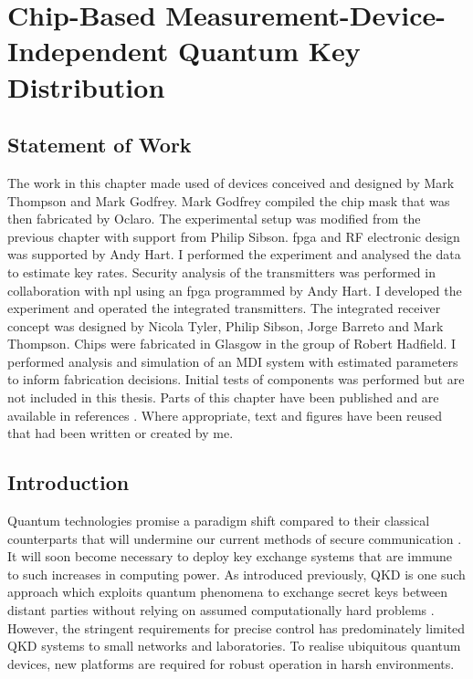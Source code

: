 %
%
\graphicspath{{./chapters/chapter04/fig04/}}

\let\textcircled=\pgftextcircled
\chapter[Chip-Based Measurement-Device-Independent QKD]{Chip-Based Measurement-Device-Independent Quantum Key Distribution}
\label{chap:mdiqkd}

\section*{Statement of Work}

The work in this chapter made used of devices conceived and designed by Mark Thompson and Mark Godfrey. Mark Godfrey compiled the chip mask that was then fabricated by Oclaro. The experimental setup was modified from the previous chapter with support from Philip Sibson. \Ac{fpga} and RF electronic design was supported by Andy Hart. I performed the experiment and analysed the data to estimate key rates. Security analysis of the transmitters was performed in collaboration with \acl{npl} using an \acs{fpga} programmed by Andy Hart. I developed the experiment and operated the integrated transmitters. The integrated receiver concept was designed by Nicola Tyler, Philip Sibson, Jorge Barreto and Mark Thompson. Chips were fabricated in Glasgow in the group of Robert Hadfield. I performed analysis and simulation of an \ac{MDI} system with estimated parameters to inform fabrication decisions. Initial tests of components was performed but are not included in this thesis. Parts of this chapter have been published and are available in references \cite{semenenko2019mdi, semenenko2019integrated, vaquero2018}. Where appropriate, text and figures have been reused that had been written or created by me.

\section{Introduction}

Quantum technologies promise a paradigm shift compared to their classical counterparts that will undermine our current methods of secure communication \cite{shor1994}. It will soon become necessary to deploy key exchange systems that are immune to such increases in computing power. As introduced previously, \ac{QKD} is one such approach which exploits quantum phenomena to exchange secret keys between distant parties without relying on assumed computationally hard problems \cite{BB84, E91}. However, the stringent requirements for precise control has predominately limited \ac{QKD} systems to small networks and laboratories. To realise ubiquitous quantum devices, new platforms are required for robust operation in harsh environments. 

